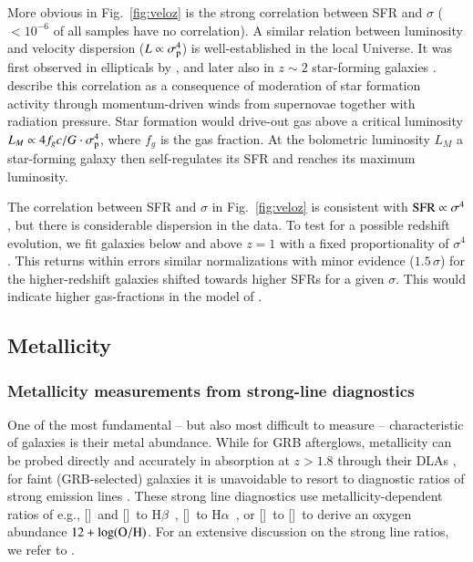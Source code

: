 \documentclass[traditabstract, longauth]{aa}
\newcommand{\hb}{H$\beta$}
\newcommand{\ha}{H$\alpha$}
\newcommand{\oh}{12+\log(\rm{O/H})}
\newcommand{\oii}{[\ion{O}{ii}]}
\newcommand{\oiii}{[\ion{O}{iii}]}
\newcommand{\nii}{[\ion{N}{ii}]}
\begin{document}
More obvious in Fig.~\ref{fig:veloz} is the strong correlation between SFR and $\sigma$ ($<10^{-6}$ of all samples have no correlation). A similar relation between luminosity and velocity dispersion ($L\propto\sigma_{\rm{p}}^{4}$) is well-established in the local Universe. It was first observed in ellipticals by \citet{1976ApJ...204..668F}, and later also in $z\sim2$ star-forming galaxies \citep{2006ApJ...646..107E}. \citet{2005ApJ...618..569M} describe this correlation as a consequence of moderation of star formation activity through momentum-driven winds from supernovae together with radiation pressure. Star formation would drive-out gas above a critical luminosity $L_{M} \propto 4f_{g}c/G\cdot\sigma_{\rm{p}}^{4}$, where $f_g$ is the gas fraction. At the bolometric luminosity $L_M$ a star-forming galaxy then self-regulates its SFR and reaches its maximum luminosity.

The correlation between SFR and $\sigma$ in Fig.~\ref{fig:veloz} is consistent with $\rm{SFR} \propto \sigma^4$, but there is considerable dispersion in the data. To test for a possible redshift evolution, we fit galaxies below and above $z=1$ with a fixed proportionality of $\sigma^4$. This returns within errors similar normalizations with minor evidence ($1.5\,\sigma$) for the higher-redshift galaxies shifted towards higher SFRs for a given $\sigma$. This would indicate higher gas-fractions in the model of \citet{2005ApJ...618..569M}.


\subsection{Metallicity}
\label{sec:met}

\subsubsection{Metallicity measurements from strong-line diagnostics}

One of the most fundamental -- but also most difficult to measure -- characteristic of galaxies is their metal abundance. While for GRB afterglows, metallicity can be probed directly and accurately in absorption at $z>1.8$ through their DLAs \citep[e.g.,][]{2004A&A...419..927V, 2006NJPh....8..195S, 2007ApJ...666..267P, 2009A&A...506..661L}, for faint (GRB-selected) galaxies it is unavoidable to resort to diagnostic ratios of strong emission lines \citep[e.g.,][]{2006ApJ...644..813E, 2008A&A...488..463M}. These strong line diagnostics use metallicity-dependent ratios of e.g., \oii\, and \oiii\, to \hb\, \citep[e.g.,][]{1979MNRAS.189...95P, 1991ApJ...380..140M, 1994ApJ...420...87Z}, \nii\, to \ha\, \citep{1979A&A....78..200A, 2004MNRAS.348L..59P}, or \nii\, to \oii\, \citep[e.g.,][]{2002ApJS..142...35K} to derive an oxygen abundance $\oh$. For an extensive discussion on the strong line ratios, we refer to \citet{2002ApJS..142...35K}.
 
\end{document}
